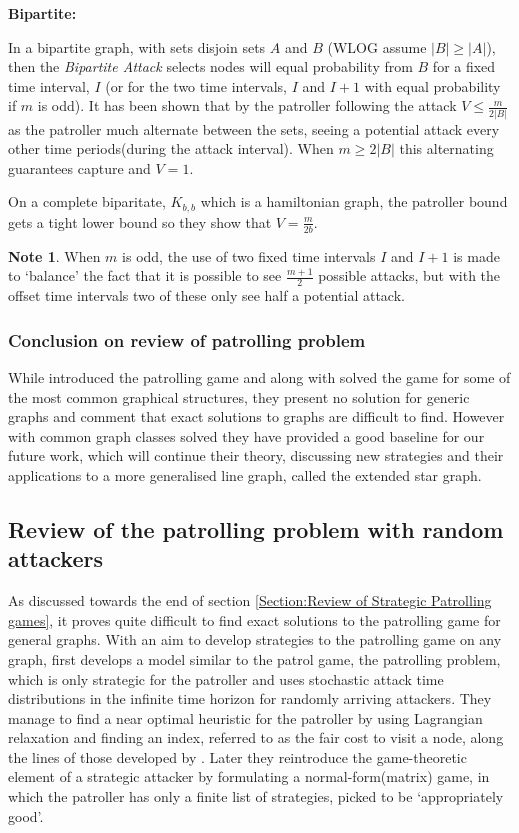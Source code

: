 \documentclass[a4paper,10pt]{article}
\theoremstyle{definition}
\theoremstyle{definition}
\theoremstyle{remark}
\theoremstyle{definition}
\newtheorem*{note}{Note}
\begin{document}
\textbf{Bipartite:}

In a bipartite graph, with sets disjoin sets $A$ and $B$ (WLOG assume $|B| \geq |A|$), then the \textit{Bipartite Attack} selects nodes will equal probability from $B$ for a fixed time interval, $I$ (or for the two time intervals, $I$ and $I+1$ with equal probability if $m$ is odd). It has been shown that by the patroller following the attack $V \leq \frac{m}{2|B|}$ as the patroller much alternate between the sets, seeing a potential attack every other time periods(during the attack interval). When $m \geq 2|B|$ this alternating guarantees capture and $V=1$.

On a complete biparitate, $K_{b,b}$ which is a hamiltonian graph, the patroller bound gets a tight lower bound so they show that $V=\frac{m}{2b}$.

\begin{note}
When $m$ is odd, the use of two fixed time intervals $I$ and $I+1$ is made to `balance' the fact that it is possible to see $\frac{m+1}{2}$ possible attacks, but with the offset time intervals two of these only see half a potential attack.
\end{note}

\subsubsection{Conclusion on review of patrolling problem}
While \cite{Alpern2011} introduced the patrolling game and along with \cite{Papadaki2016} solved the game for some of the most common graphical structures, they present no solution for generic graphs and comment that exact solutions to graphs are difficult to find. However with common graph classes solved they have provided a good baseline for our future work, which will continue their theory, discussing new strategies and their applications to a more generalised line graph, called the extended star graph.

\subsection{Review of the patrolling problem with random attackers}
\label{Section:Review of patrolling problem with random attackers}
As discussed towards the end of section \ref{Section:Review of Strategic Patrolling games}, it proves quite difficult to find exact solutions to the patrolling game for general graphs. With an aim to develop strategies to the patrolling game on any graph, \cite{Lin2013} first develops a model similar to the patrol game, the patrolling problem, which is only strategic for the patroller and uses stochastic attack time distributions in the infinite time horizon for randomly arriving attackers. They manage to find a near optimal heuristic for the patroller by using Lagrangian relaxation and finding an index, referred to as the fair cost to visit a node, along the lines of those developed by \cite{Whittle1988}. Later they reintroduce the game-theoretic element of a strategic attacker by formulating a normal-form(matrix) game, in which the patroller has only a finite list of strategies, picked to be `appropriately good'.
\end{document}

